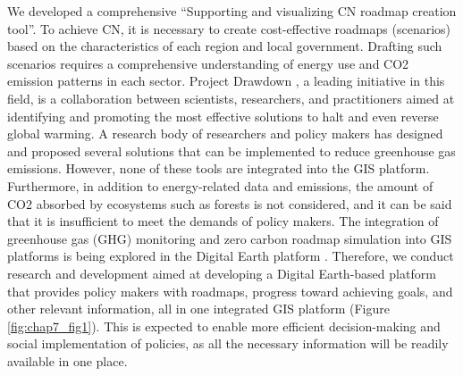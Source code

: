 We developed a comprehensive “Supporting and visualizing CN roadmap creation tool”. To achieve CN, it is necessary to create cost-effective roadmaps (scenarios) based on the characteristics of each region and local government. Drafting such scenarios requires a comprehensive understanding of energy use and CO2 emission patterns in each sector. Project Drawdown \citep{brennan2020project}, a leading initiative in this field, is a collaboration between scientists, researchers, and practitioners aimed at identifying and promoting the most effective solutions to halt and even reverse global warming. A research body of researchers and policy makers has designed and proposed several solutions that can be implemented to reduce greenhouse gas emissions. However, none of these tools are integrated into the GIS platform. Furthermore, in addition to energy-related data and emissions, the amount of CO2 absorbed by ecosystems such as forests is not considered, and it can be said that it is insufficient to meet the demands of policy makers. The integration of greenhouse gas (GHG) monitoring and zero carbon roadmap simulation into GIS platforms is being explored in the Digital Earth platform \citep{fukui2021digital}. Therefore, we conduct research and development aimed at developing a Digital Earth-based platform that provides policy makers with roadmaps, progress toward achieving goals, and other relevant information, all in one integrated GIS platform (Figure \ref{fig:chap7_fig1}). This is expected to enable more efficient decision-making and social implementation of policies, as all the necessary information will be readily available in one place.\par


